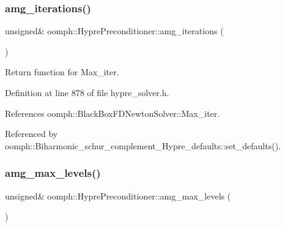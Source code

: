 \mbox{\label{classoomph_1_1HyprePreconditioner_a1fa211b49730947fe525156d08b66da4}} 
\subsubsection{\texorpdfstring{amg\+\_\+iterations()}{amg\_iterations()}}
{\footnotesize\ttfamily unsigned\& oomph\+::\+Hypre\+Preconditioner\+::amg\+\_\+iterations (\begin{DoxyParamCaption}{ }\end{DoxyParamCaption})\hspace{0.3cm}{\ttfamily [inline]}}



Return function for Max\+\_\+iter. 



Definition at line 878 of file hypre\+\_\+solver.\+h.



References oomph\+::\+Black\+Box\+F\+D\+Newton\+Solver\+::\+Max\+\_\+iter.



Referenced by oomph\+::\+Biharmonic\+\_\+schur\+\_\+complement\+\_\+\+Hypre\+\_\+defaults\+::set\+\_\+defaults().

\mbox{\label{classoomph_1_1HyprePreconditioner_a6bae8beb2e6bff788d083f1e2af4a47b}} 
\subsubsection{\texorpdfstring{amg\+\_\+max\+\_\+levels()}{amg\_max\_levels()}}
{\footnotesize\ttfamily unsigned\& oomph\+::\+Hypre\+Preconditioner\+::amg\+\_\+max\+\_\+levels (\begin{DoxyParamCaption}{ }\end{DoxyParamCaption})\hspace{0.3cm}{\ttfamily [inline]}}



